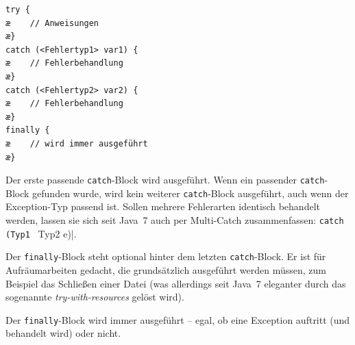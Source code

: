 \begin{minipage}{0.35\textwidth}
\begin{lstlisting}
try {	
æ    // Anweisungen
æ}
catch (<Fehlertyp1> var1) {
æ    // Fehlerbehandlung
æ}
catch (<Fehlertyp2> var2) {
æ    // Fehlerbehandlung
æ}
finally {
æ    // wird immer ausgeführt
æ}
\end{lstlisting}
\end{minipage}
\hfill
\begin{minipage}{0.6\textwidth}
\begin{compactitem}
\item Der erste passende \lstinline|catch|-Block wird ausgeführt. Wenn ein
passender \lstinline|catch|-Block gefunden wurde, wird kein weiterer
\lstinline|catch|-Block ausgeführt, auch wenn der Exception-Typ passend ist.
Sollen mehrere Fehlerarten identisch behandelt werden, lassen sie sich seit
Java~7 auch per Multi-Catch zusammenfassen:
\lstinline|catch (Typ1 | Typ2 e)|.

\item Der \lstinline|finally|-Block steht optional hinter dem letzten
\lstinline|catch|-Block.
Er ist für Aufräumarbeiten gedacht, die grundsätzlich ausgeführt werden müssen,
zum Beispiel das Schließen einer Datei (was allerdings seit Java~7 eleganter
durch das sogenannte \emph{try-with-resources} gelöst wird).

\item Der \lstinline|finally|-Block wird immer ausgeführt -- egal, ob eine
Exception auftritt (und behandelt wird) oder nicht.
\end{compactitem}
\end{minipage}
